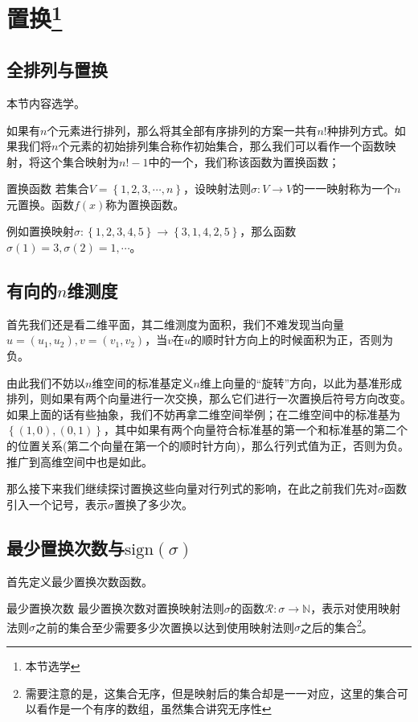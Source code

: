 \section{置换\footnote{本节选学} }

\subsection{全排列与置换}

本节内容选学。

如果有$n$个元素进行排列，那么将其全部有序排列的方案一共有$n!$种排列方式。如果我们将$n$个元素的初始排列集合称作初始集合，那么我们可以看作一个函数映射，将这个集合映射为$n!-1$中的一个，我们称该函数为置换函数；

\begin{definition}{置换函数}
	若集合$V=\left\{ 1,2,3,\cdots,n \right\}$，设映射法则$\sigma: V\rightarrow V$的一一映射称为一个$n $元置换。函数$f(x)$称为置换函数。
\end{definition}

例如置换映射$\sigma:\left\{ 1,2,3,4,5 \right\}\rightarrow \left\{ 3,1,4,2,5 \right\}$，那么函数$\sigma(1)=3,\sigma(2)=1,\cdots$。

\subsection{有向的$n$维测度}

首先我们还是看二维平面，其二维测度为面积，我们不难发现当向量$u=(u_1,u_2),v=(v_1,v_2)$，当$v$在$u$的顺时针方向上的时候面积为正，否则为负。

由此我们不妨以$n$维空间的标准基定义$n$维上向量的``旋转''方向，以此为基准形成排列，则如果有两个向量进行一次交换，那么它们进行一次置换后符号方向改变。如果上面的话有些抽象，我们不妨再拿二维空间举例；在二维空间中的标准基为$\left\{ (1,0),(0,1) \right\}$，其中如果有两个向量符合标准基的第一个和标准基的第二个的位置关系(第二个向量在第一个的顺时针方向)，那么行列式值为正，否则为负。推广到高维空间中也是如此。

那么接下来我们继续探讨置换这些向量对行列式的影响，在此之前我们先对$\sigma$函数引入一个记号，表示$\sigma$置换了多少次。

\subsection{最少置换次数与$\text{sign} (\sigma)$}

首先定义最少置换次数函数。

\begin{definition}{最少置换次数}
	最少置换次数对置换映射法则$\sigma$的函数$\mathcal{R}:\sigma \rightarrow \mathbb{N}$，表示对使用映射法则$\sigma$之前的集合至少需要多少次置换以达到使用映射法则$\sigma$之后的集合\footnote{需要注意的是，这集合无序，但是映射后的集合却是一一对应，这里的集合可以看作是一个有序的数组，虽然集合讲究无序性}。
\end{definition}

